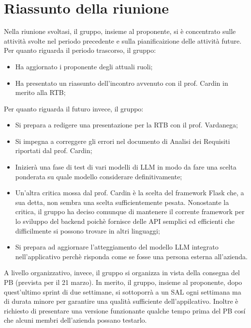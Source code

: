 \section{Riassunto della riunione}
Nella riunione svoltasi, il gruppo, insieme al proponente, si è concentrato sulle attività svolte nel periodo precedente e sulla pianificaizione delle attività future. Per quanto riguarda il periodo trascorso, il gruppo:
\begin{itemize}
    \item Ha aggiornato i proponente degli attuali ruoli;
    \item Ha presentato un riassunto dell'incontro avvenuto con il prof. Cardin in merito alla RTB;
\end{itemize}

Per quanto riguarda il futuro invece, il gruppo: 
\begin{itemize}
    \item Si prepara a redigere una presentazione per la RTB con il prof. Vardanega;
    \item Si impegna a correggere gli errori nel documento di Analisi dei Requisiti riportati dal prof. Cardin;
    \item Inizierà una fase di test di vari modelli di LLM in modo da fare una scelta ponderata su quale modello considerare definitivamente;
    \item Un'altra critica mossa dal prof. Cardin è la scelta del framework Flask che, a sua detta, non sembra una scelta sufficientemente pesata. Nonostante la critica, il gruppo ha deciso comunque di mantenere il corrente framework per lo sviluppo del backend poichè fornisce delle API semplici ed efficienti che difficilmente si possono trovare in altri linguaggi;
    \item Si prepara ad aggiornare l'atteggiamento del modello LLM integrato nell'applicativo perchè risponda come se fosse una persona esterna all'azienda. 
\end{itemize}

A livello organizzativo, invece, il gruppo si organizza in vista della consegna del PB (prevista per il 21 marzo). In merito, il gruppo, insieme al proponente, dopo quest'ultimo sprint di due settimane, si sottoporrà a un SAL ogni settimana ma di durata minore per garantire una qualità sufficiente dell'appilcativo. Inoltre è richiesto di presentare una versione funzionante qualche tempo prima del PB cosí che alcuni membri dell'azienda possano testarlo.